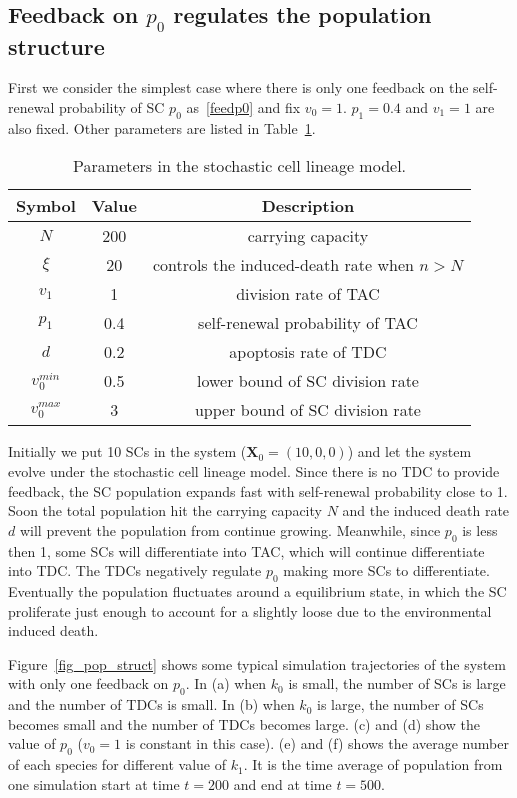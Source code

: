 \documentclass[12pt]{article}
\begin{document}
\subsection*{Feedback on $p_0$ regulates the population structure}
First we consider the simplest case where there is only
one feedback on the self-renewal probability of SC $p_0$ 
as~\eqref{feedp0} and fix $v_0=1$. $p_1=0.4$ and $v_1=1$ 
are also fixed. Other parameters are listed in Table~\ref{table_paras}. 

\begin{table}
\centering
\caption{Parameters in the stochastic cell lineage model.}
\begin{tabular}{|c|c|c|}
\hline
Symbol & Value & Description \\
\hline
$N$ & 200 & carrying capacity \\
\hline
$\xi$ & 20 & controls the induced-death rate when $n>N$ \\  
\hline
$v_1$ & 1 & division rate of TAC \\
\hline
$p_1$ & 0.4 & self-renewal probability of TAC \\
\hline
$d$ & 0.2 & apoptosis rate of TDC \\
\hline
$v_0^{min}$ & 0.5 & lower bound of SC division rate \\
\hline
$v_0^{max}$ & 3 & upper bound of SC division rate \\
\hline
\end{tabular}
\label{table_paras}
\end{table}

Initially we put 10 SCs in the system ($\mathbf{X}_0 = (10, 0, 0)$) 
and let the system evolve under the stochastic cell lineage model. 
Since there is no TDC to provide feedback, 
the SC population expands fast with self-renewal probability close to 1. 
Soon the total population hit the carrying capacity $N$ 
and the induced death rate $d$ will prevent the population 
from continue growing. Meanwhile, since $p_0$ is less then 1, 
some SCs will differentiate into TAC, 
which will continue differentiate into TDC. 
The TDCs negatively regulate $p_0$ making more
SCs to differentiate. 
Eventually the population fluctuates around a 
equilibrium state, in which the SC proliferate just
enough to account for a slightly loose due to the
environmental induced death.

Figure~\ref{fig_pop_struct} shows some typical simulation trajectories
of the system with only one feedback on $p_0$. 
In (a) when $k_0$ is small, the number of SCs is large
and the number of TDCs is small. 
In (b) when $k_0$ is large, the number of SCs becomes
small and the number of TDCs becomes large. (c) and (d) 
show the value of $p_0$ ($v_0=1$ is constant in this case).
(e) and (f) shows the average number of each species for
different value of $k_1$. It is the time average of population
from one simulation start at time $t=200$ and end at time $t=500$.
\end{document}
